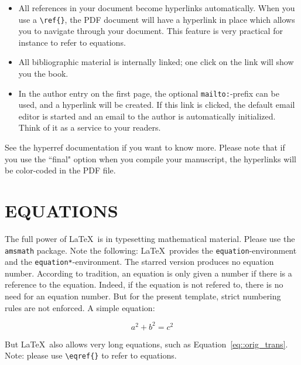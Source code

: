 \documentclass[12pt]{article}
\begin{document}
\begin{itemize}
\item All references in your document become hyperlinks automatically. When you use a \verb|\ref{}|, the PDF document will have a hyperlink in place which allows you to navigate through your document. This feature is very practical for instance to refer to equations.

\item All bibliographic material is internally linked; one click on the link will show you the book.

\item In the author entry on the first page, the optional \verb|mailto:|-prefix can be used, and a hyperlink will be created. If this link is clicked, the default email editor is started and an email to the author is automatically initialized. Think of it as a service to your readers.
\end{itemize}

See the hyperref documentation if you want to know more. Please note that if you use the ``final" option when you compile your manuscript, the hyperlinks will be color-coded in the PDF file.

%
\section{EQUATIONS}
\label{sect::equations}

The full power of \LaTeX\ is in typesetting mathematical material. Please use the \texttt{amsmath} package. Note the following: \LaTeX\ provides the \texttt{equation}-environment and the \texttt{equation*}-environment. The starred version produces no equation number. According to tradition, an equation is only given a number if there is a reference to the equation. Indeed, if the equation is not refered to, there is no need for an equation number. But for the present template, strict numbering rules are not enforced. A simple equation:

\begin{equation*}
  a^2 + b^2 = c^2
\end{equation*}

But \LaTeX\ also allows very long equations, such as Equation~\eqref{eq::orig_trans}. Note: please use \verb|\eqref{}| to refer to equations.
\end{document}
